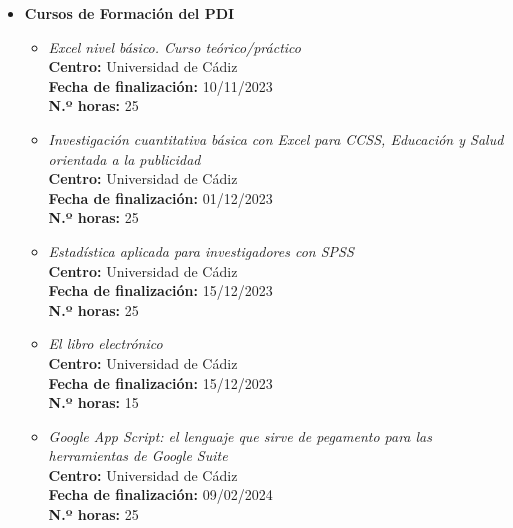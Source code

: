 \begin{enumerate}[label=\alph*)]
\begin{itemize}
\begin{itemize}[label=\textbullet]
  \item Curso de especializaci\'on: \textit{Directrices actuales de la Ling\"u\'istica en el \'ambito de la comunicaci\'on y las tecnolog\'ias}\\
  \textbf{Centro:} Escuela de Doctorado de la Universidad de C\'adiz\\
  \textbf{Fecha de finalizaci\'on:} 27/06/2024\\
  \textbf{N.º horas:} 125
  \end{itemize}

  
  \item \textbf{Cursos de Formación del PDI}
  \begin{itemize}[label=\textbullet]

  \item \textit{Excel nivel básico. Curso teórico/práctico}\\
  \textbf{Centro:} Universidad de Cádiz\\
  \textbf{Fecha de finalización:} 10/11/2023\\
  \textbf{N.º horas:} 25

  \item \textit{Investigación cuantitativa básica con Excel para CCSS, Educación y Salud orientada a la publicidad}\\
  \textbf{Centro:} Universidad de Cádiz\\
  \textbf{Fecha de finalización:} 01/12/2023\\
  \textbf{N.º horas:} 25

  \item \textit{Estadística aplicada para investigadores con SPSS}\\
  \textbf{Centro:} Universidad de Cádiz\\
  \textbf{Fecha de finalización:} 15/12/2023\\
  \textbf{N.º horas:} 25

  \item \textit{El libro electrónico}\\
  \textbf{Centro:} Universidad de Cádiz\\
  \textbf{Fecha de finalización:} 15/12/2023\\
  \textbf{N.º horas:} 15

  \item \textit{Google App Script: el lenguaje que sirve de pegamento para las herramientas de Google Suite}\\
  \textbf{Centro:} Universidad de Cádiz\\
  \textbf{Fecha de finalización:} 09/02/2024\\
  \textbf{N.º horas:} 25


\end{itemize}
\end{itemize}
\end{enumerate}
